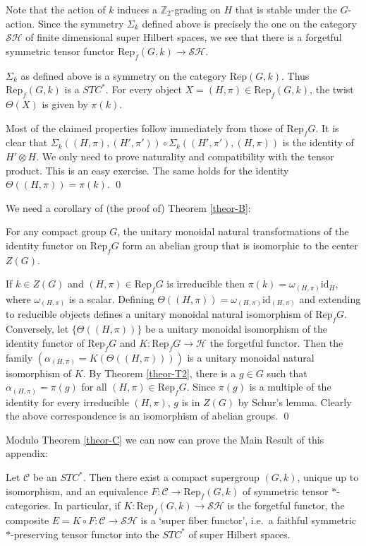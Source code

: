 \documentclass[11pt]{article}
\newenvironment{bxd}%
  {\bigskip\noindent\begin{Sbox}\begin{minipage}{0.9\textwidth} }%
  {\end{minipage}\end{Sbox}\fbox{\TheSbox}\bigskip}%
\theoremstyle{definition}
\theoremstyle{definition}
\theoremstyle{remark}
\def\2#1{{\mathcal #1}}
\def\7#1{{\mathbb #1}}
\newcommand{\Rep}{\mathrm{Rep}}
\newcommand{\rarr}{\rightarrow}
\def\id{\mathrm{id}}
\begin{document}
\brem Note that the action of $k$ induces a $\7Z_2$-grading on $H$ that is stable under the
$G$-action. Since the symmetry $\Sigma_k$ defined above is precisely the one on the category
$\2S\2H$ of finite dimensional super Hilbert spaces, we see that there is a forgetful symmetric
tensor functor $\Rep_f(G,k)\rarr\2S\2H$.
\erem

\blemma
$\Sigma_k$ as defined above is a symmetry on the category $\Rep(G,k)$. Thus $\Rep_f(G,k)$ is a
$STC^*$. For every object $X=(H,\pi)\in\Rep_f(G,k)$, the twist $\Theta(X)$ is given by $\pi(k)$.
\elemma

\prf Most of the claimed properties follow immediately from those of $\Rep_fG$. 
It is clear that $\Sigma_k((H,\pi),(H',\pi'))\circ\Sigma_k((H',\pi'),(H,\pi))$ is the identity
of $H'\otimes H$. We only need to prove naturality and compatibility with the tensor product. This
is an easy exercise. The same holds for the identity $\Theta((H,\pi))=\pi(k)$.
\qed

We need a corollary of (the proof of) Theorem \ref{theor-B}:

\bcoro \label{coro-twist}
For any compact group $G$, the unitary monoidal natural transformations of the identity functor on
$\Rep_fG$ form an abelian group that is isomorphic to the center $Z(G)$.
\ecoro

\prf If $k\in Z(G)$ and $(H,\pi)\in\Rep_fG$ is irreducible then $\pi(k)=\omega_{(H,\pi)}\id_H$, where  
$\omega_{(H,\pi)}$ is a scalar. Defining $\Theta((H,\pi))=\omega_{(H,\pi)}\id_{(H,\pi)}$ and
extending to reducible objects defines a unitary monoidal natural isomorphism of $\Rep_fG$.
Conversely, let $\{\Theta((H,\pi))\}$ be a unitary monoidal isomorphism of the identity functor of
$\Rep_fG$ and $K:\Rep_fG\rarr\2H$ the forgetful functor. Then the family 
$(\alpha_{(H,\pi)}=K(\Theta((H,\pi))))$ is a unitary monoidal natural isomorphism of $K$. By Theorem
\ref{theor-T2}, there is a $g\in G$ such that $\alpha_{(H,\pi)}=\pi(g)$ for all
$(H,\pi)\in\Rep_fG$. Since $\pi(g)$ is a multiple of the identity for every irreducible $(H,\pi)$,
$g$ is in $Z(G)$ by Schur's lemma. Clearly the above correspondence is an isomorphism of abelian
groups. 
\qed

Modulo Theorem \ref{theor-C} we can now can prove the Main Result of this appendix:

\begin{bxd}
\btheor \label{theor-A}   
Let $\2C$ be an $STC^*$. Then there exist a compact supergroup $(G,k)$, unique up to isomorphism,
and an equivalence $F:\2C\rarr\Rep_f(G,k)$ of symmetric tensor $*$-categories. In particular, if
$K:\Rep_f(G,k)\rarr\2S\2H$ is the forgetful functor, the composite $E=K\circ F:\2C\rarr\2S\2H$ is a
`super fiber functor', i.e.\ a faithful symmetric $*$-preserving tensor functor into the $STC^*$ of
super Hilbert spaces.
\etheor
\end{bxd}
\end{document}
